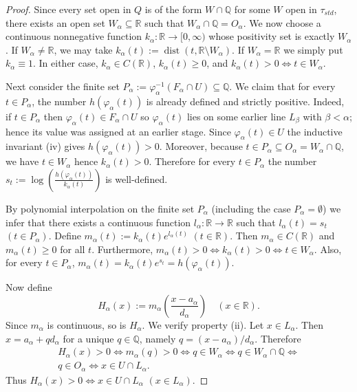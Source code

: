 \documentclass[11pt]{amsart} %
\theoremstyle{definition}
\newcommand{\Q}{\mathbb{Q}}
\begin{document}
\begin{proof}
Since every set open in $Q$ is of the form $W\cap \Q$ for some $W$ open in $\tau_{std}$, there exists an open set $W_{\alpha}\subseteq\mathbb{R}$ such that $W_{\alpha}\cap\mathbb{Q}=O_{\alpha}$. We now choose a continuous nonnegative function $k_{\alpha}:\mathbb{R}\rightarrow[0,\infty)$ whose positivity set is exactly $W_{\alpha}$. If $W_{\alpha}\ne\mathbb{R}$, we may take $k_{\alpha}(t):=\operatorname{dist}(t,\mathbb{R}\setminus W_{\alpha})$. If $W_{\alpha}=\mathbb{R}$ we simply put $k_{\alpha}\equiv1$. In either case, $k_{\alpha}\in C(\mathbb{R})$, $k_{\alpha}(t)\ge0$, and $k_{\alpha}(t)>0\iff t\in W_{\alpha}$.

Next consider the finite set $P_{\alpha}:=\varphi_{\alpha}^{-1}(F_{\alpha}\cap U)\subseteq\mathbb{Q}$. We claim that for every $t\in P_{\alpha}$, the number $h(\varphi_{\alpha}(t))$ is already defined and strictly positive. Indeed, if $t\in P_{\alpha}$ then $\varphi_{\alpha}(t)\in F_{\alpha}\cap U$ so $\varphi_{\alpha}(t)$ lies on some earlier line $L_{\beta}$ with $\beta<\alpha$; hence its value was assigned at an earlier stage. Since $\varphi_{\alpha}(t)\in U$ the inductive invariant (iv) gives $h(\varphi_{\alpha}(t))>0$. Moreover, because $t\in P_{\alpha}\subseteq O_{\alpha}=W_{\alpha}\cap\mathbb{Q}$, we have $t\in W_{\alpha}$ hence $k_{\alpha}(t)>0$. Therefore for every $t\in P_{\alpha}$ the number $s_{t}:=\log\left(\frac{h(\varphi_{\alpha}(t))}{k_{\alpha}(t)}\right)$ is well-defined.

By polynomial interpolation on the finite set $P_{\alpha}$ (including the case $P_{\alpha}=\emptyset$) we infer that there exists a continuous function $l_{\alpha}:\mathbb{R}\rightarrow\mathbb{R}$ such that $l_{\alpha}(t)=s_{t}$ $(t\in P_{\alpha})$. Define $m_{\alpha}(t):=k_{\alpha}(t)e^{l_{\alpha}(t)}$ $(t\in\mathbb{R})$. Then $m_{\alpha}\in C(\mathbb{R})$ and $m_{\alpha}(t)\ge0$ for all $t$. Furthermore, $m_{\alpha}(t)>0\iff k_{\alpha}(t)>0\iff t\in W_{\alpha}$. Also, for every $t\in P_{\alpha}$, $m_{\alpha}(t)=k_{\alpha}(t)e^{s_{t}}=h(\varphi_{\alpha}(t))$.

Now define
\begin{equation} 
H_{\alpha}(x):=m_{\alpha}\left(\frac{x-a_{\alpha}}{d_{\alpha}}\right) \quad (x\in\mathbb{R}). \end{equation} 
Since $m_{\alpha}$ is continuous, so is $H_{\alpha}$. We verify property (ii). Let $x\in L_{\alpha}$. Then $x=a_{\alpha}+qd_{\alpha}$ for a unique $q\in\mathbb{Q}$, namely $q=(x-a_{\alpha})/d_{\alpha}$. Therefore
\begin{align*}
 H_{\alpha}(x)>0\iff m_{\alpha}(q)>0\iff q\in W_{\alpha}\iff q\in W_{\alpha}\cap\mathbb{Q}\iff \\ 
 q\in O_{\alpha}\iff x\in U\cap L_{\alpha}. \end{align*} 
Thus $H_{\alpha}(x)>0\iff x\in U\cap L_{\alpha}$ $(x\in L_{\alpha})$.


\end{proof}
\end{document}
